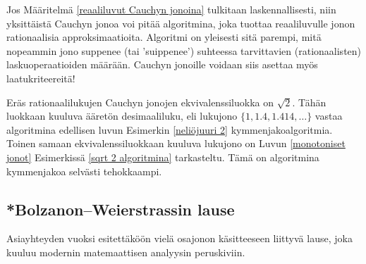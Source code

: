 Jos Määritelmä \ref{reaaliluvut Cauchyn jonoina} tulkitaan laskennallisesti, niin yksittäistä
Cauchyn jonoa voi pitää algoritmina, joka tuottaa reaaliluvulle jonon rationaalisia 
approksimaatioita. Algoritmi on yleisesti sitä parempi, mitä nopeammin jono suppenee 
(tai 'suippenee') suhteessa tarvittavien (rationaalisten) laskuoperaatioiden määrään. Cauchyn
jonoille voidaan siis asettaa myös laatukriteereitä!
\begin{Exa} Eräs rationaalilukujen Cauchyn jonojen ekvivalenssiluokka on $\sqrt{2}$. Tähän
luokkaan kuuluva ääretön desimaaliluku, eli lukujono $\{1,1.4,1.414,\ldots\}$ vastaa
algoritmina edellisen luvun Esimerkin \ref{neliöjuuri 2} kymmenjakoalgoritmia. Toinen samaan
ekvivalenssiluokkaan kuuluva lukujono on Luvun \ref{monotoniset jonot} Esimerkissä
\ref{sqrt 2 algoritmina} tarkasteltu. Tämä on algoritmina kymmenjakoa selvästi tehokkaampi.
\loppu \end{Exa}

\subsection{*Bolzanon--Weierstrassin lause}

Asiayhteyden vuoksi esitettäköön vielä osajonon käsitteeseen liittyvä lause, joka kuuluu
modernin matemaattisen analyysin peruskiviin.

